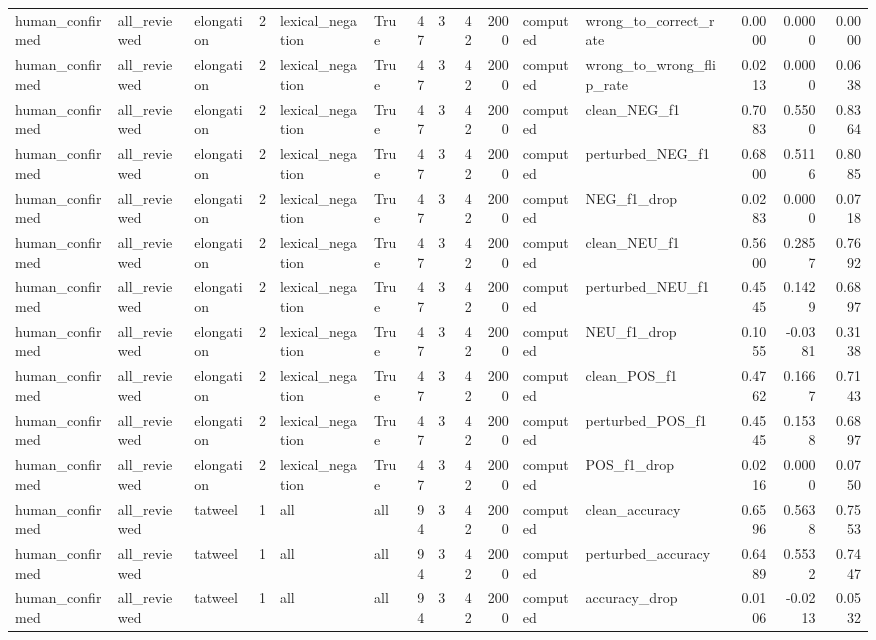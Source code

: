 \begin{tabular}{lllrllrrrrllrrr}
human_confirmed & all_reviewed & elongation & 2 & lexical_negation & True & 47 & 3 & 42 & 2000 & computed & wrong_to_correct_rate & 0.0000 & 0.0000 & 0.0000 \\
human_confirmed & all_reviewed & elongation & 2 & lexical_negation & True & 47 & 3 & 42 & 2000 & computed & wrong_to_wrong_flip_rate & 0.0213 & 0.0000 & 0.0638 \\
human_confirmed & all_reviewed & elongation & 2 & lexical_negation & True & 47 & 3 & 42 & 2000 & computed & clean_NEG_f1 & 0.7083 & 0.5500 & 0.8364 \\
human_confirmed & all_reviewed & elongation & 2 & lexical_negation & True & 47 & 3 & 42 & 2000 & computed & perturbed_NEG_f1 & 0.6800 & 0.5116 & 0.8085 \\
human_confirmed & all_reviewed & elongation & 2 & lexical_negation & True & 47 & 3 & 42 & 2000 & computed & NEG_f1_drop & 0.0283 & 0.0000 & 0.0718 \\
human_confirmed & all_reviewed & elongation & 2 & lexical_negation & True & 47 & 3 & 42 & 2000 & computed & clean_NEU_f1 & 0.5600 & 0.2857 & 0.7692 \\
human_confirmed & all_reviewed & elongation & 2 & lexical_negation & True & 47 & 3 & 42 & 2000 & computed & perturbed_NEU_f1 & 0.4545 & 0.1429 & 0.6897 \\
human_confirmed & all_reviewed & elongation & 2 & lexical_negation & True & 47 & 3 & 42 & 2000 & computed & NEU_f1_drop & 0.1055 & -0.0381 & 0.3138 \\
human_confirmed & all_reviewed & elongation & 2 & lexical_negation & True & 47 & 3 & 42 & 2000 & computed & clean_POS_f1 & 0.4762 & 0.1667 & 0.7143 \\
human_confirmed & all_reviewed & elongation & 2 & lexical_negation & True & 47 & 3 & 42 & 2000 & computed & perturbed_POS_f1 & 0.4545 & 0.1538 & 0.6897 \\
human_confirmed & all_reviewed & elongation & 2 & lexical_negation & True & 47 & 3 & 42 & 2000 & computed & POS_f1_drop & 0.0216 & 0.0000 & 0.0750 \\
human_confirmed & all_reviewed & tatweel & 1 & all & all & 94 & 3 & 42 & 2000 & computed & clean_accuracy & 0.6596 & 0.5638 & 0.7553 \\
human_confirmed & all_reviewed & tatweel & 1 & all & all & 94 & 3 & 42 & 2000 & computed & perturbed_accuracy & 0.6489 & 0.5532 & 0.7447 \\
human_confirmed & all_reviewed & tatweel & 1 & all & all & 94 & 3 & 42 & 2000 & computed & accuracy_drop & 0.0106 & -0.0213 & 0.0532 \\

\end{tabular}
